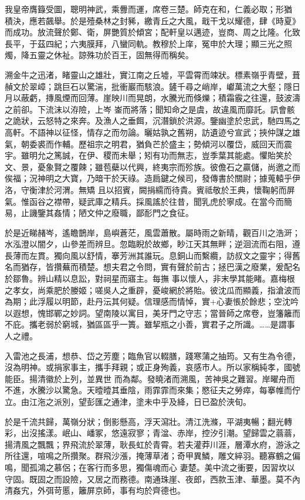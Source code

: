 \begin{pinyinscope}
 我皇帝膺籙受圖，聰明神武，乘釁而運，席卷三楚。師克在和，仁義必取；形猶
 積決，應若飆舉。於是殪桑林之封豨，繳青丘之大風，戢干戈以耀德，肆《時夏》而成功。放流聲於鄭、衛，屏艷質於傾宮；配軒皇以邁迹，豈商、周之比隆。化致長平，于茲四紀；六夷膜拜，八蠻同軌。教穆於上庠，冤申於大理；顯三光之照燭，降五靈之休祉。諒殊功於百王，固無得而稱矣。



 溯金牛之迅渚，睹靈山之雄壯，實江南之丘墟，平雲霄而竦狀。標素嶺乎青壁，葺赬文於翠嶂；跳巨石以驚湍，批衝巖而駭浪。鏟千尋之峭岸，巘萬流之大壑；隱日月以蔽虧，摶風煙而回薄。崖映川而晃朗，水騰光而倏爍；積霜霰之往還，鼓波濤之前卻。下流沫以洊險，上岑
 崟而將落；聞知命之是虞，故違風而靡託。訊會骸之詭狀，云怒特之來奔。及漁人之垂餌，沉潛鎖於洪源。鑒幽塗於忠武，馳四馬之高軒。不語神以征怪，情存之而勿論。曬姑孰之舊朔，訪遺迹兮宣武；挾仲謀之雄氣，朝委裘而作輔。歷祖宗之明君，猶負芒於盛主；勢傾河以覆岱，威回天而震宇。雖明允之篤誠，在伊、稷而未舉；矧有功而無志，豈季葉其能處。懼貽笑於文、景，憂象賢之覆餗；雖苞蘗以代興，終夷宗而殄族。彼儋石之贏儲，尚邀之而俟福；況神明之大寶，乃暗干於天祿。造扃鍵之候司，發傳書於關尉；據蒐轅乎伊洛，守衡津於河渭。無矯
 且以招賓，闕捐繻而待貴。賓祗敬於王典，懷鞠躬而屏氣。惟函谷之襟帶，疑武庫之精兵。採風謠於往昔，聞乳虎於寧成。在當今而簡易，止譏鑒其姦情；陋文仲之廢職，鄙耏門之食征。



 於是近睇赭岑，遙瞻鵲岸，島嶼蒼茫，風雲蕭散。屬時雨之新晴，觀百川之浩涆；水泓澄以闇夕，山參差而辨旦。忽臨睨於故鄉，眇江天其無畔；逆洄流而右阻，遵長薄而左貫。獨向風以舒情，搴芳洲其誰玩。息銅山而繫纜，訪叔文之靈宇；得舊名而猶存，皆攢蕪而積楚。想夫君之令問，實有聲於前古；拯巴漢之廢業，爰配名於鄒魯。辨山精以息訟，對祠星而寤主。每撫
 事以懷人，非末學其能睹。嘉梅根之孝女，尚乘肥於媵姬；嗟吳人之重辟，憂峻網於將貽。彼沈瓜而顯義，指滄波而為期；此浮履以明節，赴丹沄其何疑。信理感而情悼，實+心妻悵於餘悲；空沈吟以遐想，愧邯鄲之妙詞。望南陵以寓目，美牙門之守志；當晉師之席卷，豈籓籬而不庇。攜老弱於窮城，猶區區乎一簣。雖挈瓶之小善，實君子之所識。……是謂事人之禮。



 入雷池之長浦，想恭、岱之芳塵；臨魚官以輟膳，踐寒蒲之抽筠。又有生為令德，沒為明神。或捐家事主，攜手拜親；或正身殉義，哀感市人。所以家稱純孝，國號能臣。揚清徽於上列，並異世
 而為鄰。發曉渚而溯風，苦神吳之難習。岸曜舟而不進，水騰沙以驚急。天曀曀其垂陰，雨霏霏而來集；愍征夫之勞瘁，每搴帷而佇立。由江沲之派別，望彭匯之通津，塗未中乎及絳，日已盈於浹旬。



 於是千流共歸，萬嶺分狀；倒影懸高，浮天瀉壯。清江洗滌，平湖夷暢；翻光轉彩，出沒搖漾。岷山、嶓冢，悠遠寂寥；青湓、赤岸，控汐引潮。望歸雲之蓊蓊，揚清風之飄飄；界飛流於翠薄，耿長虹於青霄。若夫灌莽川涯，層潭水府，游泳之所往還，喧鳴之所攢聚。群飛沙漲，掩薄草渚；奇甲異鱗，雕文綷羽。聽寡鶴之偏鳴，聞孤鴻之慕侶；在客行而多思，獨傷魂而心
 妻楚。美中流之衝要，因習坎以守固。既固之而設險，又居之而務德。南通珠崖、夜郎，西款玉津、華墨。莫不內清姦宄，外弭苛慝，籬屏京師，事有均於齊德也。




\end{pinyinscope}

